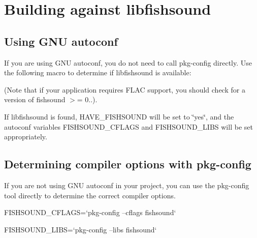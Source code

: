 \section{\-Building against libfishsound}
\label{group__building}
\subsection{\-Using G\-N\-U autoconf}\label{group__building_autoconf}
\-If you are using \-G\-N\-U autoconf, you do not need to call pkg-\/config directly. \-Use the following macro to determine if libfishsound is available\-:


 (\-Note that if your application requires \-F\-L\-A\-C support, you should check for a version of fishsound $>$= 0..).

\-If libfishsound is found, \-H\-A\-V\-E\-\_\-\-F\-I\-S\-H\-S\-O\-U\-N\-D will be set to \char`\"{}yes\char`\"{}, and the autoconf variables \-F\-I\-S\-H\-S\-O\-U\-N\-D\-\_\-\-C\-F\-L\-A\-G\-S and \-F\-I\-S\-H\-S\-O\-U\-N\-D\-\_\-\-L\-I\-B\-S will be set appropriately.\subsection{\-Determining compiler options with pkg-\/config}\label{group__building_pkg-config}
\-If you are not using \-G\-N\-U autoconf in your project, you can use the pkg-\/config tool directly to determine the correct compiler options.


\begin{DoxyPre}
 FISHSOUND\_CFLAGS=`pkg-config --cflags fishsound`\end{DoxyPre}



\begin{DoxyPre} FISHSOUND\_LIBS=`pkg-config --libs fishsound`
 \end{DoxyPre}
 